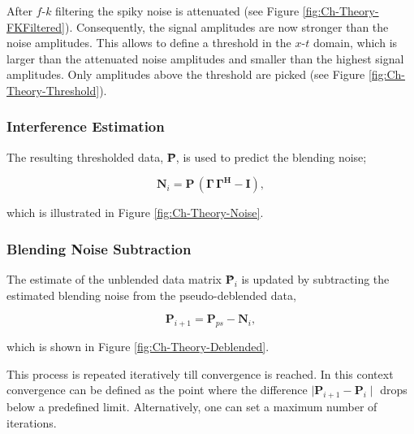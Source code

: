 After $f$-$k$ filtering the spiky noise is attenuated (see Figure \ref{fig:Ch-Theory-FKFiltered}). Consequently, the signal amplitudes are now stronger than the noise amplitudes. This allows to define a threshold in the $x$-$t$ domain, which is larger than the attenuated noise amplitudes and smaller than the highest signal amplitudes. Only amplitudes above the threshold are picked (see Figure \ref{fig:Ch-Theory-Threshold}). 

\subsubsection*{Interference Estimation}

The resulting thresholded data, \textbf{\={P}}, is used to predict the blending noise;

\begin{equation}
	\textbf{\^{N}}_{i} = \textbf{\={P}} \, (\mathbf{\Gamma \, \Gamma^H} - \textbf{I}),
	\label{eq:Ch-Theory-NoiseEstimation}
\end{equation}

which is illustrated in Figure \ref{fig:Ch-Theory-Noise}.
 


\subsubsection*{Blending Noise Subtraction} 

The estimate of the unblended data matrix \textbf{\^{P}}$_{i}$ is updated by subtracting the estimated blending noise from the pseudo-deblended data,

\begin{equation}
	\textbf{\^P}_{i+1} = \textbf{P}_{ps} - \textbf{\^{N}}_{i}, 
	\label{eq:Ch-Theory-DataUpdate1}
\end{equation}

which is shown in Figure \ref{fig:Ch-Theory-Deblended}.

This process is repeated iteratively till convergence is reached. In this context convergence can be defined as the point where the difference $\mid \textbf{\^P}_{i+1} - \textbf{\^{P}}_{i} \mid$ drops below a predefined limit. Alternatively, one can set a maximum number of iterations. 

